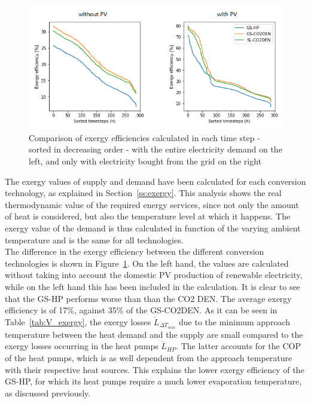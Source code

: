 \documentclass{article}
\begin{document}


\begin{figure}[tph]
	\centering
	\includegraphics[width=0.875\linewidth]{Images/V_EXE}
	\caption{Comparison of exergy efficiencies calculated in each time step - sorted in decreasing order - with the entire electricity demand on the left, and only with electricity bought from the grid on the right}
	\label{fig:v_exe}
\end{figure}

The exergy values of supply and demand have been calculated for each conversion technology, as explained in Section~\ref{ss:exergy}. This analysis shows the real thermodynamic value of the required energy services, since not only the amount of heat is considered, but also the temperature level at which it happens. The exergy value of the demand is thus calculated in function of the varying ambient temperature and is the same for all technologies.\\

The difference in the exergy efficiency between the different conversion technologies is shown in Figure~\ref{fig:v_exe}. On the left hand, the values are calculated without taking into account the domestic PV production of renewable electricity, while on the left hand this has been included in the calculation. It is clear to see that the GS-HP performs worse than than the CO2 DEN. The average exergy efficiency is of 17\%, against 35\% of the GS-CO2DEN. As it can be seen in Table~\ref{tab:V_exergy}, the exergy losses $\dot{L}_{\Delta T_{min}}$ due to the minimum approach temperature between the heat demand and the supply are small compared to the exergy losses occurring in the heat pumps $\dot{L}_{HP}$. The latter accounts for the COP of the heat pumps, which is as well dependent from the approach temperature with their respective heat sources. This explains the lower exergy efficiency of the GS-HP, for which its heat pumps require a much lower evaporation temperature, as discussed previously.\\
\end{document}

